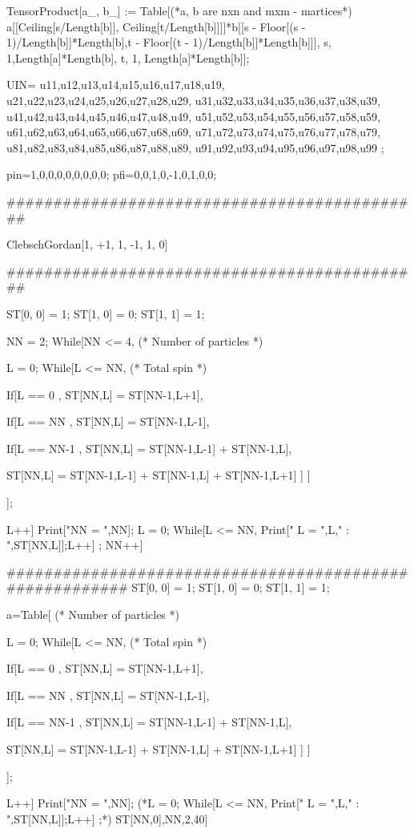 TensorProduct[a_, b_] :=    Table[(*a, b are nxn and mxm - martices*) a[[Ceiling[s/Length[b]], Ceiling[t/Length[b]]]]*b[[s - Floor[(s - 1)/Length[b]]*Length[b],t - Floor[(t - 1)/Length[b]]*Length[b]]], {s, 1,Length[a]*Length[b]}, {t, 1, Length[a]*Length[b]}];


UIN=
{
{u11,u12,u13,u14,u15,u16,u17,u18,u19},
{u21,u22,u23,u24,u25,u26,u27,u28,u29},
{u31,u32,u33,u34,u35,u36,u37,u38,u39},
{u41,u42,u43,u44,u45,u46,u47,u48,u49},
{u51,u52,u53,u54,u55,u56,u57,u58,u59},
{u61,u62,u63,u64,u65,u66,u67,u68,u69},
{u71,u72,u73,u74,u75,u76,u77,u78,u79},
{u81,u82,u83,u84,u85,u86,u87,u88,u89},
{u91,u92,u93,u94,u95,u96,u97,u98,u99}
};

pin={1,0,0,0,0,0,0,0,0};
pfi={0,0,1,0,-1,0,1,0,0};

#############################################

ClebschGordan[{1, +1}, {1, -1}, {1, 0}]

#############################################


ST[0, 0] = 1;
ST[1, 0] = 0;
ST[1, 1] = 1;

NN = 2; While[NN <= 4,         (* Number of particles *)

L  = 0; While[L <= NN,        (* Total spin *)


If[L == 0 , ST[NN,L] =  ST[NN-1,L+1],

   If[L == NN , ST[NN,L] = ST[NN-1,L-1],

       If[L == NN-1  , ST[NN,L] = ST[NN-1,L-1] + ST[NN-1,L],

         ST[NN,L] =  ST[NN-1,L-1] + ST[NN-1,L] + ST[NN-1,L+1]
         ]
     ]

];


L++]
Print["NN = ",NN];
L  = 0; While[L <= NN, Print[" L = ",L," : ",ST[NN,L]];L++] ;
NN++]

########################################################
ST[0, 0] = 1;
ST[1, 0] = 0;
ST[1, 1] = 1;

a=Table[         (* Number of particles *)

L  = 0; While[L <= NN,        (* Total spin *)


If[L == 0 , ST[NN,L] =  ST[NN-1,L+1],

   If[L == NN , ST[NN,L] = ST[NN-1,L-1],

       If[L == NN-1  , ST[NN,L] = ST[NN-1,L-1] + ST[NN-1,L],

         ST[NN,L] =  ST[NN-1,L-1] + ST[NN-1,L] + ST[NN-1,L+1]
         ]
     ]

];


L++]
Print["NN = ",NN];
(*L  = 0; While[L <= NN, Print[" L = ",L," : ",ST[NN,L]];L++] ;*)
ST[NN,0],{NN,2,40}]

